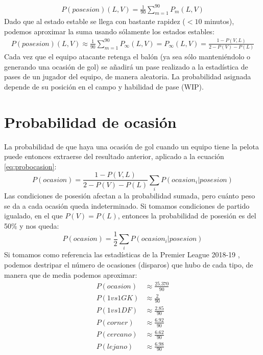 \documentclass[a4paper,9pt]{article}
\begin{document}
\begin{align}
	P(posesion)(L,V)=\frac{1}{90}\sum_{m=1}^{90}P_m(L,V)
\end{align}
Dado que al estado estable se llega con bastante rapidez ($<10$ minutos), podemos aproximar la suma usando sólamente los estados estables:
\begin{align}
	P(posesion)(L,V)\approx\frac{1}{90}\sum_{m=1}^{90}P_\infty(L,V)=P_\infty(L,V)=\frac{1-P(V,L)}{2-P(V)-P(L)}
\end{align}
Cada vez que el equipo atacante retenga el balón (ya sea sólo manteniéndolo o generando una ocasión de gol) se añadirá un pase realizado a la estadística de pases de un jugador del equipo, de manera aleatoria. La probabilidad asignada depende de su posición en el campo y habilidad de pase (WIP).


\section{Probabilidad de ocasión}\label{sec:ProbOcasion}
\def \Pocasion {\ensuremath{\frac{25.370}{90}}}
\def \PvsGK {\ensuremath{\frac{2}{90}}}
\def \PvsDF {\ensuremath{\frac{2.85}{90}}}
\def \Pcorner {\ensuremath{\frac{6.92}{90}}}
\def \Pclose {\ensuremath{\frac{6.62}{90}}}
\def \Pfar {\ensuremath{\frac{6.98}{90}}}
La probabilidad de que haya una ocasión de gol cuando un equipo tiene la pelota puede entonces extraerse del resultado anterior, aplicado a la ecuación \ref{eq:probocasion}:
\begin{equation}\label{eq:probocasion2}
	P(ocasion)=\frac{1-P(V,L)}{2-P(V)-P(L)}\sum_i{P(ocasion_i|posesion)}
\end{equation}
Las condiciones de posesión afectan a la probabilidad sumada, pero cuánto peso se da a cada ocasión queda indeterminado. Si tomamos condiciones de partido igualado, en el que $P(V)=P(L)$, entonces la probabilidad de posesión es del 50\% y nos queda:
\begin{equation}
	P(ocasion)=\frac{1}{2}\sum_i{P(ocasion_i|posesion)}
\end{equation}
Si tomamos como referencia las estadísticas de la Premier League 2018-19 \cite{PremierLeague}, podemos destripar el número de ocasiones (disparos) que hubo de cada tipo, de manera que de media podemos aproximar:
\begin{align}
	P(ocasion)&\approx\Pocasion\\
	P(1vs1GK)&\approx\PvsGK\\
	P(1vs1DF)&\approx\PvsDF\\
	P(corner)&\approx\Pcorner\\
	P(cercano)&\approx\Pclose\\
	P(lejano)&\approx\Pfar
\end{align}
\end{document}

